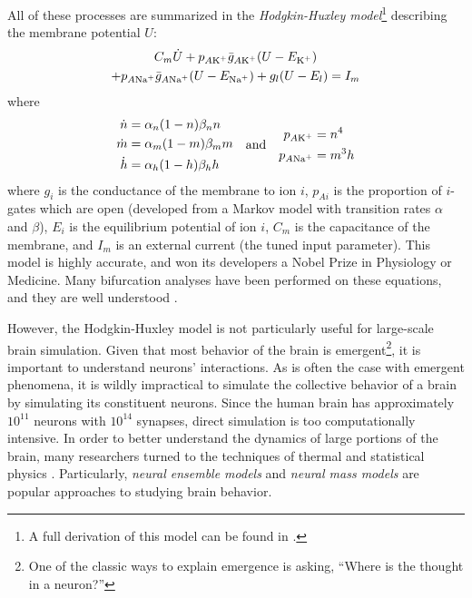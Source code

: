 All of these processes are summarized in the \textit{Hodgkin-Huxley model}\footnote{A full derivation of this model can be found in \cite{Graben2008}.} describing the membrane potential $U$:
\begin{multline}
  \label{eq:hodgkin_huxley_main}
  C_{m} \dot{U}
  +
  p_{A \ce{K^{+}}} \mean{g}_{A \ce{K^{+}}} \pqty{U - E_{\ce{K^{+}}}} \\
  +
  p_{A \ce{Na^{+}}} \mean{g}_{A \ce{Na^{+}}} \pqty{U - E_{\ce{Na^{+}}}}
  +
  g_{l} \pqty{U - E_{l}}
  =
  I_{m}
\end{multline}
where
\begin{equation}
  \label{eq:hodgkin_huxley_supplementary}
  \begin{aligned}
    \dot{n}
    &=
    \alpha_{n} \pqty{1 - n} \beta_{n} n \\
    \dot{m}
    &=
    \alpha_{m} \pqty{1 - m} \beta_{m} m \\
    \dot{h}
    &=
    \alpha_{h} \pqty{1 - h} \beta_{h} h
  \end{aligned}
  \qand
  \begin{aligned}
    p_{A \ce{K^{+}}}
    &=
    n^{4} \\
    p_{A \ce{Na^{+}}}
    &=
    m^{3} h
  \end{aligned}
\end{equation}
where $g_{i}$ is the conductance of the membrane to ion $i$, $p_{A i}$ is the proportion of $i$-gates which are open (developed from a Markov model with transition rates $\alpha$ and $\beta$), $E_{i}$ is the equilibrium potential of ion $i$, $C_{m}$ is the capacitance of the membrane, and $I_{m}$ is an external current (the tuned input parameter).
This model is highly accurate, and won its developers a Nobel Prize in Physiology or Medicine.
Many bifurcation analyses have been performed on these equations, and they are well understood \cite{Graben2008}.

However, the Hodgkin-Huxley model is not particularly useful for large-scale brain simulation.
Given that most behavior of the brain is emergent\footnote{One of the classic ways to explain emergence is asking, ``Where is the thought in a neuron?''}, it is important to understand neurons' interactions.
As is often the case with emergent phenomena, it is wildly impractical to simulate the collective behavior of a brain by simulating its constituent neurons.
Since the human brain has approximately $10^{11}$ neurons with $10^{14}$ synapses, direct simulation is too computationally intensive.
In order to better understand the dynamics of large portions of the brain, many researchers turned to the techniques of thermal and statistical physics \cite{Breakspear2017}.
Particularly, \textit{neural ensemble models} and \textit{neural mass models} are popular approaches to studying brain behavior.

